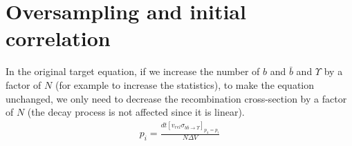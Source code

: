 \documentclass[10pt,a4paper]{article}
\begin{document}
\section{Oversampling and initial correlation}
In the original target equation, if we increase the number of $b$ and $\bar{b}$ and $\Upsilon$ by a factor of $N$ (for example to increase the statistics), to make the equation unchanged, we only need to decrease the recombination cross-section by a factor of $N$ (the decay process is not affected since it is linear).
\begin{eqnarray}
p_i = \frac{ dt [v_{rel}  \sigma_{b\bar{b}\rightarrow \Upsilon}]_{p_4 = p_i} }{N\Delta V}
\end{eqnarray}
\end{document}
